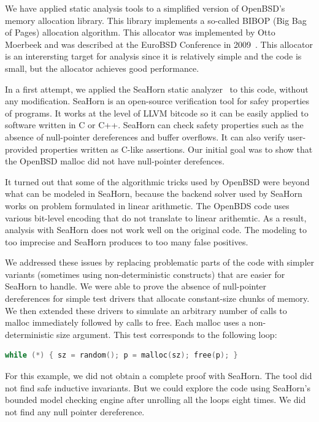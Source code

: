 \documentclass[12pt]{cslreport}
\begin{document}
We have applied static analysis tools to a simplified version of
OpenBSD's memory allocation library. This library implements a
so-called BIBOP (Big Bag of Pages) allocation algorithm. This
allocator was implemented by Otto Moerbeek and was described at the
EuroBSD Conference in 2009~\cite{Moerbeek2009}. This allocator is an
interersting target for analysis since it is relatively simple and the
code is small, but the allocator achieves good performance.

In a first attempt, we applied the SeaHorn static
analyzer~\cite{Gurfinkel+etal:SeaHorn:2015} to this code, without any
modification. SeaHorn is an open-source verification tool for safey
properties of programs. It works at the level of LLVM bitcode so it
can be easily applied to software written in C or C++. SeaHorn can
check safety properties such as the absence of null-pointer
dereferences and buffer overflows. It can also verify user-provided
properties written as C-like assertions. Our initial goal was to show
that the OpenBSD malloc did not have null-pointer derefences.

It turned out that some of the algorithmic tricks used by OpenBSD were
beyond what can be modeled in SeaHorn, because the backend solver used
by SeaHorn works on problem formulated in linear arithmetic. The
OpenBDS code uses various bit-level encoding that do not translate to
linear arithemtic. As a result, analysis with SeaHorn does not work
well on the original code. The modeling to too imprecise and SeaHorn
produces to too many false positives.

We addressed these issues by replacing problematic parts of the code
with simpler variants (sometimes using non-deterministic constructs)
that are easier for SeaHorn to handle. We were able to prove the
absence of null-pointer dereferences for simple test drivers that
allocate constant-size chunks of memory. We then extended these
drivers to simulate an arbitrary number of calls to malloc immediately
followed by calls to free. Each malloc uses a non-deterministic size
argument. This test corresponds to the following loop:
\begin{lstlisting}[language=C]
    while (*) { sz = random(); p = malloc(sz); free(p); }
\end{lstlisting}
For this example, we did not obtain a complete proof with SeaHorn. The
tool did not find safe inductive invariants. But we could explore the
code using SeaHorn's bounded model checking engine after unrolling all
the loops eight times. We did not find any null pointer dereference.
\end{document}

